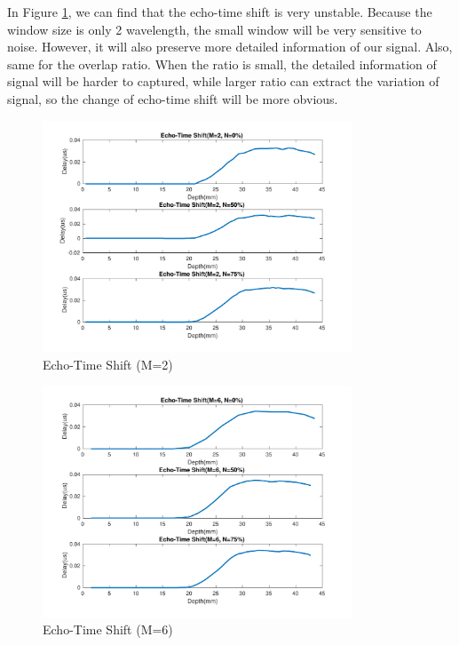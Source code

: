 \documentclass{article}
\begin{document}
In Figure \ref{fig:shift-2}, we can find that the echo-time shift is very unstable. Because the window size is only 2
wavelength, the small window will be very sensitive to noise. However, it will also preserve more detailed information of
our signal. Also, same for the overlap ratio. When the ratio is small, the detailed information of signal will be harder
to captured, while larger ratio can extract the variation of signal, so the change of echo-time shift will be more obvious.

\begin{figure}[H]
    \centering
    \includegraphics[width=0.82\textwidth]{src/shift_2.pdf}
    \caption{Echo-Time Shift (M=2)}
    \label{fig:shift-2}
\end{figure}
\begin{figure}[H]
    \centering
    \includegraphics[width=0.82\textwidth]{src/shift_6.pdf}
    \caption{Echo-Time Shift (M=6)}
    \label{fig:shift-6}
\end{figure}
\end{document}
